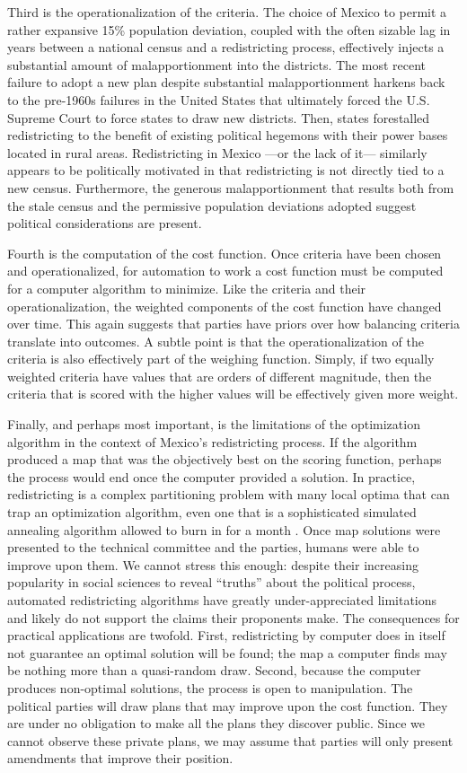\documentclass[letter,12pt]{article}
\begin{document}
Third is the operationalization of the criteria. The choice of Mexico to permit a rather expansive 15\% population deviation, coupled with the often sizable lag in years between a national census and a redistricting process, effectively injects a substantial amount of malapportionment into the districts. The most recent failure to adopt a new plan despite substantial malapportionment harkens back to the pre-1960s failures in the United States that ultimately forced the U.S. Supreme Court to force states to draw new districts. Then, states forestalled redistricting to the benefit of existing political hegemons with their power bases located in rural areas. Redistricting in Mexico ---or the lack of it--- similarly appears to be politically motivated in that redistricting is not directly tied to a new census. Furthermore, the generous malapportionment that results both from the stale census and the permissive population deviations adopted suggest political considerations are present.

Fourth is the computation of the cost function. Once criteria have been chosen and operationalized, for automation to work a cost function must be computed for a computer algorithm to minimize. Like the criteria and their operationalization, the weighted components of the cost function have changed over time. This again suggests  that parties have priors over how balancing criteria translate into outcomes. A subtle point is that the operationalization of the criteria is also effectively part of the weighing function. Simply, if two equally weighted criteria have values that are orders of different magnitude, then the criteria that is scored with the higher values will be effectively given more weight.

Finally, and perhaps most important, is the limitations of the optimization algorithm in the context of Mexico's redistricting process. If the algorithm produced a map that was the objectively best on the scoring function, perhaps the process would end once the computer provided a solution. In practice, redistricting is a complex partitioning problem with many local optima that can trap an optimization algorithm, even one that is a sophisticated simulated annealing algorithm allowed to burn in for a month \citep{altman.mcdonald2011bard}. Once map solutions were presented to the technical committee and the parties, humans were able to improve upon them. We cannot stress this enough: despite their increasing popularity in social sciences to reveal ``truths'' about the political process, automated redistricting algorithms have greatly under-appreciated limitations and likely do not support the claims their proponents make. The consequences for practical applications are twofold. First, redistricting by computer does in itself not guarantee an optimal solution will be found; the map a computer finds may be nothing more than a quasi-random draw. Second, because the computer produces non-optimal solutions, the process is open to manipulation. The political parties will draw plans that may improve upon the cost function. They are under no obligation to make all the plans they discover public. Since we cannot observe these private plans, we may assume that parties will only present amendments that improve their position.
\end{document}
